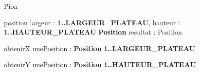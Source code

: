 \begin{algorithme}
	
	\begin{enregistrement}{Pion}
	\end{enregistrement}
	
	\vspace*{5mm} 
	
	\fonction
	{position}
	{largeur : \textbf{1..LARGEUR\_PLATEAU}, hauteur : \textbf{1..HAUTEUR\_PLATEAU}}
	{\textbf{Position}}
	{resultat : Position}
	{
		}
	
	\vspace*{5mm} 
	
	\fonction
	{obtenirX}
	{unePosition : \textbf{Position}}
	{\textbf{1..LARGEUR\_PLATEAU}}
	{}
	{}
	
	\vspace*{5mm} 
	
	\fonction
	{obtenirY}
	{unePosition : \textbf{Position}}
	{\textbf{1..HAUTEUR\_PLATEAU}}
	{}
	{}
	
	
\end{algorithme}